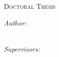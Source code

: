 \documentclass[
11pt, %
english, %
singlespacing, %
headsepline, %
]{MastersDoctoralThesis} %
\theoremstyle{definition}
\theoremstyle{definition} %
\theoremstyle{remark}
\begin{document}
\begin{titlepage}
	\begin{center}
		
		{\huge \bfseries \ttitle\par}\vspace{0.4cm} %
		
		\vspace*{.06\textheight}
		
		\textsc{\Large Doctoral Thesis}\\[0.5cm] %
						
		\vspace*{.06\textheight}		

		
		\emph{Author:}\\
		\authorname \\
		
		\vspace*{.06\textheight}
		
		\emph{Supervisors:}\\
		\supname \\

		\vspace*{.06\textheight}
				
		
		\large \textit{\deptname}\\[0.3cm] %
		\vspace*{.04\textheight}
				

\end{center}
\end{titlepage}
\end{document}
